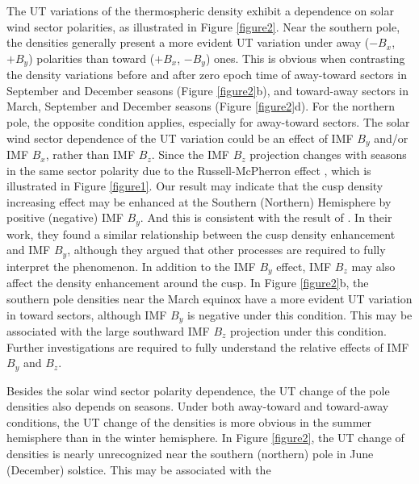 \documentclass[draft, grl]{/home/guod/Documents/template/agu_template/AGUTeX}
\begin{document}
\begin{article}
    The UT variations of the thermospheric density exhibit a dependence on solar
    wind sector polarities, as illustrated in Figure \ref{figure2}. 
    Near the southern pole, the densities generally present a more evident UT 
    variation under away ($-B_x$, $+B_y$) polarities than toward ($+B_x$, $-B_y$)
    ones.
    This is obvious when contrasting the density variations before and after zero
    epoch time of away-toward sectors in September and December seasons (Figure 
    \ref{figure2}b), and toward-away sectors in March, September and December 
    seasons (Figure \ref{figure2}d).
    For the northern pole, the opposite condition applies, especially for 
    away-toward sectors.
    The solar wind sector dependence of the UT variation could be an effect of
    IMF $B_y$ and/or IMF $B_x$, rather than IMF $B_z$. 
    Since the IMF $B_z$ projection changes with seasons in the same sector 
    polarity due to the Russell-McPherron effect \citep{Russell1973}, which is
    illustrated in Figure \ref{figure1}.
    Our result may indicate that the cusp density increasing effect may be 
    enhanced at the Southern (Northern) Hemisphere by positive (negative) IMF 
    $B_y$.
    And this is consistent with the result of \citet{Yamazaki2015a}. 
    In their work, they found a similar relationship between the cusp density 
    enhancement and IMF $B_y$, although they argued that other processes are 
    required to fully interpret the phenomenon.
    In addition to the IMF $B_y$ effect, IMF $B_z$ may also affect the density 
    enhancement around the cusp. 
    In Figure \ref{figure2}b, the southern pole densities near the March equinox 
    have a more evident UT variation in toward sectors, although IMF $B_y$ is
    negative under this condition. 
    This may be associated with the large southward IMF $B_z$ projection under 
    this condition.
    Further investigations are required to fully understand the relative effects
    of IMF $B_y$ and $B_z$.

    Besides the solar wind sector polarity dependence, the UT change of the pole
    densities also depends on seasons. Under both away-toward and toward-away
    conditions, the UT change of the densities is more obvious in the summer
    hemisphere than in the winter hemisphere. In Figure \ref{figure2}, the UT
    change of densities is nearly unrecognized near the southern (northern) pole
    in June (December) solstice. This may be associated with the
    


\end{article}
\end{document}
